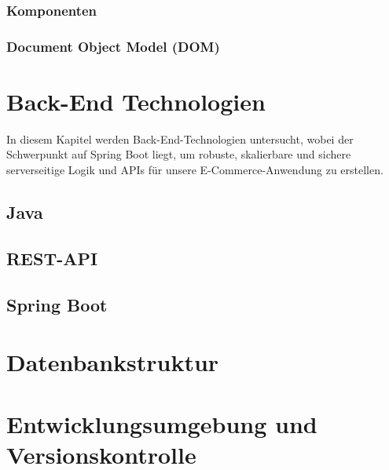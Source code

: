 \subsubsection{Komponenten}

\subsubsection{Document Object Model (DOM)}

\section{Back-End Technologien}

In diesem Kapitel werden Back-End-Technologien untersucht, wobei der Schwerpunkt auf Spring Boot liegt, um robuste, skalierbare und sichere serverseitige Logik und APIs für unsere E-Commerce-Anwendung zu erstellen.

\subsection{Java}

\subsection{REST-API}

\subsection{Spring Boot}

\section{Datenbankstruktur}

\section{Entwicklungsumgebung und Versionskontrolle}



